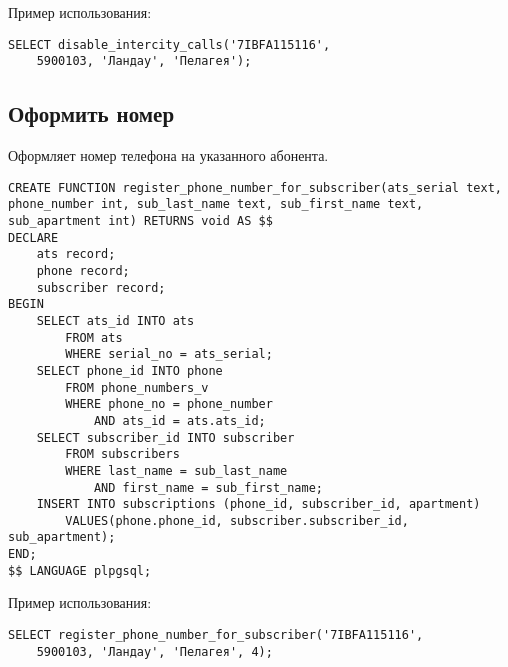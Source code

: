 \documentclass{report}
\begin{document}
Пример использования:
\begin{lstlisting}
SELECT disable_intercity_calls('7IBFA115116',
    5900103, 'Ландау', 'Пелагея');
\end{lstlisting}

\subsection*{Оформить номер}

Оформляет номер телефона на указанного абонента.

\begin{lstlisting}
CREATE FUNCTION register_phone_number_for_subscriber(ats_serial text, phone_number int, sub_last_name text, sub_first_name text, sub_apartment int) RETURNS void AS $$
DECLARE
    ats record;
    phone record;
    subscriber record;
BEGIN
    SELECT ats_id INTO ats 
        FROM ats 
        WHERE serial_no = ats_serial;
    SELECT phone_id INTO phone
        FROM phone_numbers_v
        WHERE phone_no = phone_number
            AND ats_id = ats.ats_id;
    SELECT subscriber_id INTO subscriber
        FROM subscribers
        WHERE last_name = sub_last_name
            AND first_name = sub_first_name;
    INSERT INTO subscriptions (phone_id, subscriber_id, apartment)
        VALUES(phone.phone_id, subscriber.subscriber_id, sub_apartment);
END;
$$ LANGUAGE plpgsql;
\end{lstlisting}

Пример использования:
\begin{lstlisting}
SELECT register_phone_number_for_subscriber('7IBFA115116',
    5900103, 'Ландау', 'Пелагея', 4);
\end{lstlisting}
\end{document}

